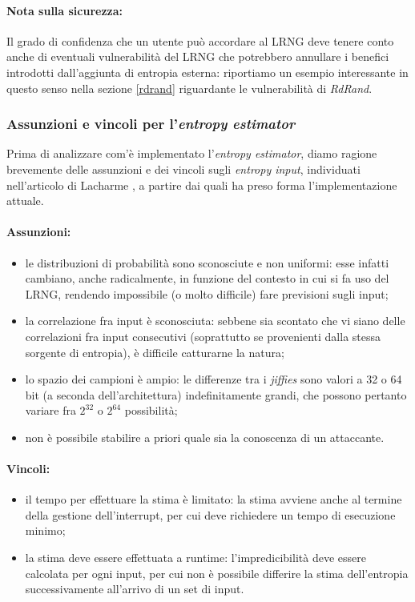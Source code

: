 \documentclass{article}
\begin{document}
\paragraph{Nota sulla sicurezza:} Il grado di confidenza che un utente può
accordare al LRNG deve tenere conto anche di eventuali vulnerabilità del LRNG
che potrebbero annullare i benefici introdotti dall'aggiunta di entropia
esterna: riportiamo un esempio interessante in questo senso nella sezione
\ref{rdrand} riguardante le vulnerabilità di \emph{RdRand}.

\subsubsection{Assunzioni e vincoli per l'\emph{entropy
estimator}}\label{vincoliStima} Prima di analizzare com'è implementato
l'\emph{entropy estimator}, diamo ragione brevemente delle assunzioni e dei
vincoli sugli \emph{entropy input}, individuati nell'articolo di Lacharme
\cite{lach}, a partire dai quali ha preso forma l'implementazione attuale.
\paragraph{Assunzioni:}
\begin{itemize}
  \item le distribuzioni di probabilità sono sconosciute e non uniformi: esse
  infatti cambiano, anche radicalmente, in funzione del contesto in cui si fa
  uso del LRNG, rendendo impossibile (o molto difficile) fare previsioni sugli
  input;
  \item la correlazione fra input è sconosciuta: sebbene sia scontato che vi
  siano delle correlazioni fra input consecutivi (soprattutto se provenienti
  dalla stessa sorgente di entropia), è difficile catturarne la natura;
  \item lo spazio dei campioni è ampio: le differenze tra i \emph{jiffies} sono
  valori a 32 o 64 bit (a seconda dell'architettura) indefinitamente grandi, che
  possono pertanto variare fra $2^{32}$ o $2^{64}$ possibilità;
  \item non è possibile stabilire a priori quale sia la conoscenza di un
  attaccante.
\end{itemize}
\paragraph{Vincoli:}
\begin{itemize}
  \item il tempo per effettuare la stima è limitato: la stima avviene anche al
  termine della gestione dell'interrupt, per cui deve richiedere un tempo di
  esecuzione minimo;
  \item la stima deve essere effettuata a runtime: l'impredicibilità deve essere
  calcolata per ogni input, per cui non è possibile differire la stima
  dell'entropia successivamente all'arrivo di un set di input.
\end{itemize}
 
\end{document}

